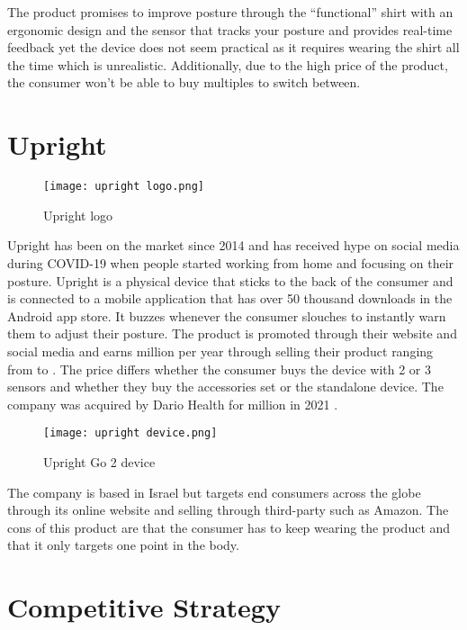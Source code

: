 The product promises to improve posture through the “functional” shirt with an ergonomic design and the sensor that tracks your posture and provides real-time feedback yet the device does not seem practical as it requires wearing the shirt all the time which is unrealistic. Additionally, due to the high price of the product, the consumer won’t be able to buy multiples to switch between.

\section{Upright}

\begin{figure}[H]
    \centering
    \texttt{[image: upright logo.png]}
    \caption{Upright logo}
    \label{fig:enter-label}
\end{figure}

Upright has been on the market since 2014 \cite{uprightpose} and has received hype on social media during COVID-19 when people started working from home and focusing on their posture. Upright is a physical device that sticks to the back of the consumer and is connected to a mobile application that has over 50 thousand downloads in the Android app store. It buzzes whenever the consumer slouches to instantly warn them to adjust their posture. The product is promoted through their website and social media and earns  million per year through selling their product \cite{upright_growjo} ranging from  to . The price differs whether the consumer buys the device with 2 or 3 sensors and whether they buy the accessories set or the standalone device. The company was acquired by Dario Health for  million in 2021 \cite{dariohealth_acquisition}. 

\begin{figure}[H]
    \centering
    \texttt{[image: upright device.png]}
    \caption{Upright Go 2 device}
    \label{fig:enter-label2}
\end{figure}

The company is based in Israel but targets end consumers across the globe through its online website and selling through third-party such as Amazon. The cons of this product are that the consumer has to keep wearing the product and that it only targets one point in the body.

\section{Competitive Strategy}

